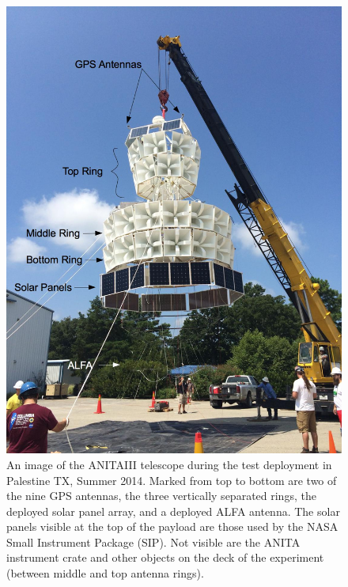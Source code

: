 \begin{figure}
\centering
	\includegraphics[height=0.9\textheight]{figures/ANITA3_hangtest2_annotated}
	\caption{An image of the ANITAIII telescope during the test deployment in Palestine TX, Summer 2014.  Marked from top to bottom are two of the nine GPS antennas, the three vertically separated rings, the deployed solar panel array, and a deployed ALFA antenna.  The solar panels visible at the top of the payload are those used by the NASA Small Instrument Package (SIP).  Not visible are the ANITA instrument crate and other objects on the deck of the experiment (between middle and top antenna rings).}
	\label{fig:ANITA3_hangtest}
\end{figure}	
	
